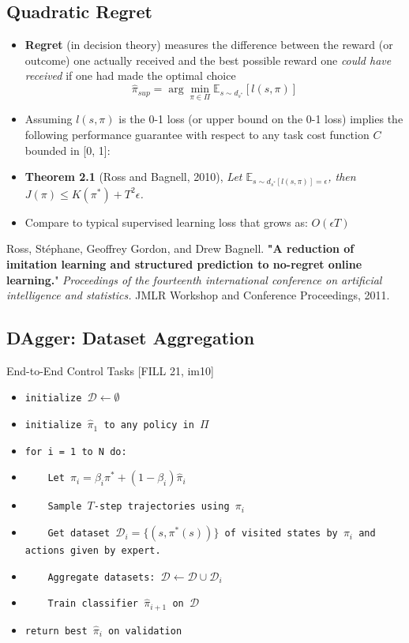 \documentclass[10pt]{article}
\begin{document}
\subsection*{Quadratic Regret}
\begin{itemize}
	\item \textbf{Regret} (in decision theory) measures the difference between the reward (or outcome) one actually received and the best possible reward one \textit{could have received} if one had made the optimal choice
	\[\hat{\pi}_{sup} = \arg \min_{\pi \in \Pi} \mathbb{E}_{s \sim d_{s^*}} [l(s, \pi)]\]
    \item Assuming $l(s, \pi)$ is the 0-1 loss (or upper bound on the 0-1 loss) implies the following performance guarantee with respect to any task cost function $C$ bounded in [0, 1]:
    \item \textbf{Theorem 2.1} (Ross and Bagnell, 2010), \textit{Let $\mathbb{E}_{s \sim d_{s^*} [l(s, \pi)] = \epsilon}$, then $J(\pi) \leq K(\pi^*) + T^2 \epsilon$.}
    \item Compare to typical supervised learning loss that grows as: $O(\epsilon T)$    
\end{itemize}
Ross, Stéphane, Geoffrey Gordon, and Drew Bagnell. \textbf{"A reduction of imitation learning and structured prediction to no-regret online learning.}" \textit{Proceedings of the fourteenth international conference on artificial intelligence and statistics.} JMLR Workshop and Conference Proceedings, 2011.

\subsection*{DAgger: Dataset Aggregation}
End-to-End Control Tasks
[FILL 21, im10]

\begin{itemize}[label={~}]
    \item \texttt{initialize $\mathcal{D} \leftarrow \emptyset$}
    \item \texttt{initialize $\hat{\pi}_1$ to any policy in $\Pi$}
    \item \texttt{for i = 1 to N do:}
    \item \texttt{~~~~Let $\pi_i = \beta_i \pi^* + (1 - \beta_i) \hat{\pi}_i$}
    \item \texttt{~~~~Sample $T$-step trajectories using $\pi_i$}
    \item \texttt{~~~~Get dataset $\mathcal{D}_i = \{(s, \pi^*(s))\}$ of visited states by $\pi_i$ and actions given by expert.}
    \item \texttt{~~~~Aggregate datasets: $\mathcal{D} \leftarrow \mathcal{D} \cup \mathcal{D}_i$}
    \item \texttt{~~~~Train classifier $\hat{\pi}_{i + 1}$ on $\mathcal{D}$}
    \item \texttt{return best $\hat{\pi}_i$ on validation}
\end{itemize}
\end{document}
